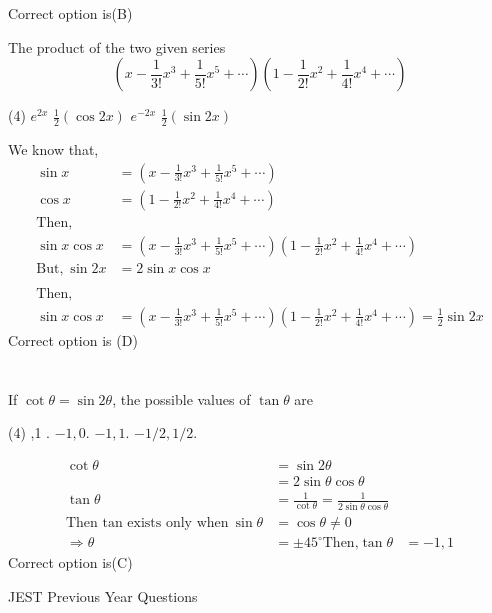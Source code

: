 \begin{questions}
\begin{answer}
	Correct option is(B)
\end{answer}
\begin{minipage}{\textwidth}
	\question  The product of the two given series
	$$
	\left(x-\frac{1}{3 !} x^{3}+\frac{1}{5 !} x^{5}+\cdots\right)\left(1-\frac{1}{2 !} x^{2}+\frac{1}{4 !} x^{4}+\cdots\right)
	$$
	{}
\end{minipage}
\begin{tasks}(4)
	\task[\textbf{A.}] $e^{2 x}$
	\task[\textbf{B.}] $\frac{1}{2}(\cos 2 x)$
	\task[\textbf{C.}] $e^{-2 x}$
	\task[\textbf{D.}] $\frac{1}{2}(\sin 2 x)$
\end{tasks}
\begin{answer}
	We know that,
	\begin{align*}
	\sin x&=\left(x-\frac{1}{3 !} x^{3}+\frac{1}{5 !} x^{5}+\cdots\right)\\
	\cos x&=\left(1-\frac{1}{2 !} x^{2}+\frac{1}{4 !} x^{4}+\cdots\right)\\
	\text{Then,}\\
	\sin x \cos x&=\left(x-\frac{1}{3 !} x^{3}+\frac{1}{5 !} x^{5}+\cdots\right)\left(1-\frac{1}{2 !} x^{2}+\frac{1}{4 !} x^{4}+\cdots\right)\\
	\text{But,}\ \sin 2x&=2\sin x \cos x\\\\
	\text{Then,}\\
	\sin x \cos x&=\left(x-\frac{1}{3 !} x^{3}+\frac{1}{5 !} x^{5}+\cdots\right)\left(1-\frac{1}{2 !} x^{2}+\frac{1}{4 !} x^{4}+\cdots\right)=\frac{1}{2}\sin 2x
	\end{align*}
	Correct option is (D)
\end{answer}

\section*{}

\begin{minipage}{\textwidth}
	\question If $\cot \theta=\sin 2 \theta$, the possible values of $\tan \theta$ are
	{}
\end{minipage}
\begin{tasks}(4)
	,1 . 
	\task[\textbf{B.}]$-1,0$. 
	\task[\textbf{C.}]$-1,1$. 
	\task[\textbf{D.}]$-1 / 2,1 / 2$. 
\end{tasks}
\begin{answer}
	\begin{align*}
	\cot \theta&=\sin 2 \theta\\
	&=2\sin \theta \cos \theta\\
	\tan \theta &=\frac{1}{\cot \theta}=\frac{1}{2\sin \theta \cos \theta}\\
	\text{Then tan exists only when}\ \sin \theta &= \cos \theta \neq 0\\
	\Rightarrow \theta&= \pm 45^{\circ}
	\text{Then,} \tan \theta &=-1,1
	\end{align*}
	Correct option is(C)
\end{answer}
\begin{abox}
	JEST Previous Year Questions
	\end{abox}

\end{questions}
